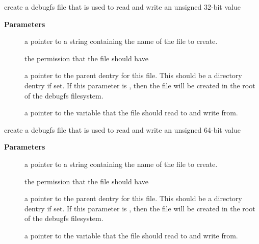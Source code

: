 \documentclass[a4paper,8pt,english]{sphinxmanual}
\begin{document}
\begin{fulllineitems}
\label{filesystems/index:c.debugfs_create_x32}
create a debugfs file that is used to read and write an unsigned 32-bit value

\end{fulllineitems}


\textbf{Parameters}
\begin{description}
\item[{}] \leavevmode
a pointer to a string containing the name of the file to create.

\item[{}] \leavevmode
the permission that the file should have

\item[{}] \leavevmode
a pointer to the parent dentry for this file.  This should be a
directory dentry if set.  If this parameter is , then the
file will be created in the root of the debugfs filesystem.

\item[{}] \leavevmode
a pointer to the variable that the file should read to and write
from.

\end{description}

\begin{fulllineitems}
\label{filesystems/index:c.debugfs_create_x64}
create a debugfs file that is used to read and write an unsigned 64-bit value

\end{fulllineitems}


\textbf{Parameters}
\begin{description}
\item[{}] \leavevmode
a pointer to a string containing the name of the file to create.

\item[{}] \leavevmode
the permission that the file should have

\item[{}] \leavevmode
a pointer to the parent dentry for this file.  This should be a
directory dentry if set.  If this parameter is , then the
file will be created in the root of the debugfs filesystem.

\item[{}] \leavevmode
a pointer to the variable that the file should read to and write
from.

\end{description}
\end{document}
